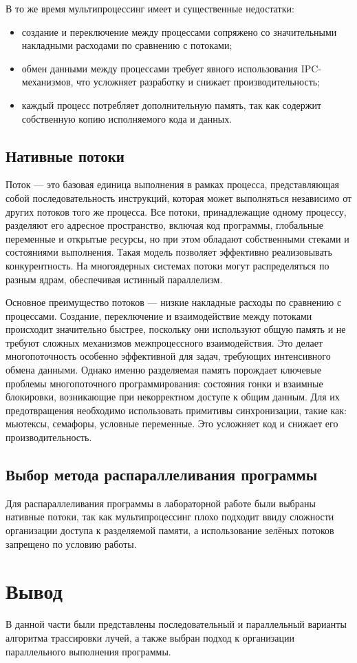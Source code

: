 В то же время мультипроцессинг имеет и существенные недостатки: 
\begin{itemize}
	\item создание и переключение между процессами сопряжено со значительными накладными расходами по сравнению с потоками;
	\item обмен данными между процессами требует явного использования IPC-механизмов, что усложняет разработку и снижает производительность;
	\item каждый процесс потребляет дополнительную память, так как содержит собственную копию исполняемого кода и данных.
\end{itemize}

\subsection{Нативные потоки}
Поток --- это базовая единица выполнения в рамках процесса, представляющая собой последовательность инструкций, которая может выполняться независимо от других потоков того же процесса. Все потоки, принадлежащие одному процессу, разделяют его адресное пространство, включая код программы, глобальные переменные и открытые ресурсы, но при этом обладают собственными стеками и состояниями выполнения. Такая модель позволяет эффективно реализовывать конкурентность. На многоядерных системах потоки могут распределяться по разным ядрам, обеспечивая истинный параллелизм.

Основное преимущество потоков --- низкие накладные расходы по сравнению с процессами. Создание, переключение и взаимодействие между потоками происходит значительно быстрее, поскольку они используют общую память и не требуют сложных механизмов межпроцессного взаимодействия. Это делает многопоточность особенно эффективной для задач, требующих интенсивного обмена данными. Однако именно разделяемая память порождает ключевые проблемы многопоточного программирования: состояния гонки и взаимные блокировки, возникающие при некорректном доступе к общим данным. Для их предотвращения необходимо использовать примитивы синхронизации, такие как: мьютексы, семафоры, условные переменные. Это усложняет код и снижает его производительность.

\subsection{Выбор метода распараллеливания программы}

Для распараллеливания программы в лабораторной работе были выбраны нативные потоки, так как мультипроцессинг плохо подходит ввиду сложности организации доступа к разделяемой памяти, а использование зелёных потоков запрещено по условию работы.

 \section*{Вывод}
 
В данной части были представлены последовательный и параллельный варианты алгоритма трассировки лучей, а также выбран подход к организации параллельного выполнения программы.
\clearpage
